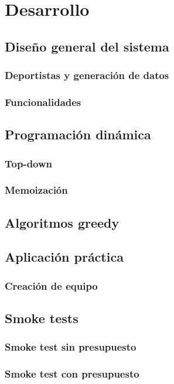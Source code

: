 \chapter{Desarrollo}

\section{Diseño general del sistema}



\subsection{Deportistas y generación de datos}


\subsection{Funcionalidades}

\section{Programación dinámica}

\subsection{Top-down}

\subsection{Memoización}

\section{Algoritmos greedy}

\section{Aplicación práctica}

\subsection{Creación de equipo}

\section{Smoke tests}

\subsection{Smoke test sin presupuesto}

\subsection{Smoke test con presupuesto}
